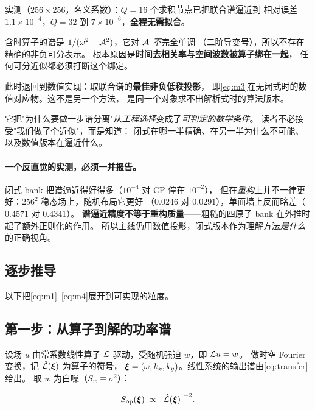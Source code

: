 \documentclass[11pt,a4paper]{article}
\begin{document}
实测（$256\times256$，名义系数）：$Q=16$ 个求积节点已把联合谱逼近到
相对误差 $1.1\times10^{-4}$，$Q=32$ 到 $7\times10^{-6}$，\textbf{全程无需拟合}。

\begin{proposition}[空间$+$时间：闭式不成立]
含时算子的谱是 $1/(\omega^2 + \mathcal{A}^2)$，它对 $\mathcal{A}$ \emph{不}完全单调
（二阶导变号），所以不存在精确的非负可分表示。
根本原因是\textbf{时间去相关率与空间波数被算子绑在一起}，
任何可分近似都必须打断这个绑定。
\end{proposition}

此时退回到数值实现：取联合谱的\textbf{最佳非负低秩投影}，
即\cref{eq:m3}在无闭式时的数值对应物。这不是另一个方法，
是同一个对象求不出解析式时的算法版本。

\begin{takeaway}[为什么这个划分值得写出来]
它把"为什么要做一步谱分离"从\emph{工程选择}变成了\emph{可判定的数学条件}。
读者不必接受"我们做了个近似"，而是知道：
闭式在哪一半精确、在另一半为什么不可能、以及数值版本在逼近什么。
\end{takeaway}

\paragraph{一个反直觉的实测，必须一并报告。}
闭式 bank 把谱逼近得好得多（$10^{-4}$ 对 CP 停在 $10^{-2}$），
但在\emph{重构}上并不一律更好：$256^2$ 稳态场上，随机布局它更好
（$0.0246$ 对 $0.0291$），单面墙上反而略差（$0.4571$ 对 $0.4341$）。
\textbf{谱逼近精度不等于重构质量}——粗糙的四原子 bank 在外推时起了额外正则化的作用。
所以主线仍用数值投影，闭式版本作为理解方法\emph{是什么}的正确视角。

\subsection{逐步推导}

以下把\cref{eq:m1}--\cref{eq:m4}展开到可实现的粒度。

\subsection{第一步：从算子到解的功率谱}

设场 $u$ 由常系数线性算子 $\mathcal{L}$ 驱动，受随机强迫 $w$，即 $\mathcal{L} u = w$。
做时空 Fourier 变换，记 $\hat{\mathcal{L}}(\boldsymbol{\xi})$ 为算子的\textbf{符号}，
$\boldsymbol{\xi} = (\omega, k_x, k_y)$。线性系统的输出谱由\cref{eq:transfer}给出。
取 $w$ 为白噪（$S_w \equiv \sigma^2$）：

\begin{equation}
S_{\mathrm{op}}(\boldsymbol{\xi}) \;\propto\; \bigl\lvert \hat{\mathcal{L}}(\boldsymbol{\xi}) \bigr\rvert^{-2}.
\end{equation}
\end{document}

